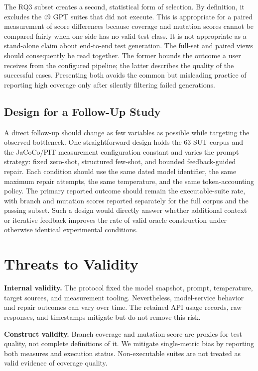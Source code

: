 ﻿\documentclass[conference]{IEEEtran}
\begin{document}
The RQ3 subset creates a second, statistical form of selection. By definition, it excludes the 49 GPT suites that did not execute. This is appropriate for a paired measurement of score differences because coverage and mutation scores cannot be compared fairly when one side has no valid test class. It is not appropriate as a stand-alone claim about end-to-end test generation. The full-set and paired views should consequently be read together. The former bounds the outcome a user receives from the configured pipeline; the latter describes the quality of the successful cases. Presenting both avoids the common but misleading practice of reporting high coverage only after silently filtering failed generations.

\subsection{Design for a Follow-Up Study}
A direct follow-up should change as few variables as possible while targeting the observed bottleneck. One straightforward design holds the 63-SUT corpus and the JaCoCo/PIT measurement configuration constant and varies the prompt strategy: fixed zero-shot, structured few-shot, and bounded feedback-guided repair. Each condition should use the same dated model identifier, the same maximum repair attempts, the same temperature, and the same token-accounting policy. The primary reported outcome should remain the executable-suite rate, with branch and mutation scores reported separately for the full corpus and the passing subset. Such a design would directly answer whether additional context or iterative feedback improves the rate of valid oracle construction under otherwise identical experimental conditions.

\section{Threats to Validity}
\label{sec:threats}

\textbf{Internal validity.} The protocol fixed the model snapshot, prompt, temperature, target sources, and measurement tooling. Nevertheless, model-service behavior and repair outcomes can vary over time. The retained API usage records, raw responses, and timestamps mitigate but do not remove this risk.

\textbf{Construct validity.} Branch coverage and mutation score are proxies for test quality, not complete definitions of it. We mitigate single-metric bias by reporting both measures and execution status. Non-executable suites are not treated as valid evidence of coverage quality.
\end{document}

